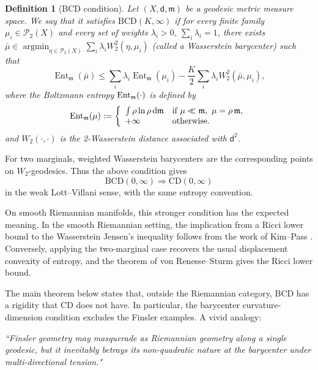 \documentclass[a4paper,11pt]{article}
\numberwithin{equation}{section}
\newtheorem{definition}[theorem]{Definition}
\newcommand{\Ent}{\operatorname{Ent}}
\newcommand{\argmin}{\operatorname*{argmin}}
\newcommand{\dd}{\mathrm d}
\newcommand{\cP}{\mathcal P}
\newcommand{\mm}{\mathfrak m}
\begin{document}
	\begin{definition}[BCD condition]
		\label{def:bcd-infty}
		Let $(X,\mathsf{d},\mathfrak{m})$ be a geodesic metric measure space. We say that it satisfies $\mathrm{BCD}(K,\infty)$ if for every finite family \(\mu_i\in\cP_2(X)\) and every set of weights $\lambda_i>0$, $\sum_i\lambda_i=1$, there exists $\bar\mu \in\argmin_{\eta\in \cP_2(X)} \sum_{i}\lambda_i W_2^2(\eta,\mu_i)$ (called a Wasserstein barycenter) such that
		\begin{equation}\label{jensen}
			\Ent_\mm(\bar\mu)\le \sum_i\lambda_i\Ent_\mm(\mu_i)-\frac{K}{2} \sum_{i}\lambda_i W_2^2(\bar{\mu},\mu_i),
		\end{equation}
			where the Boltzmann entropy ${\rm Ent}_\mm(\cdot)$ is defined by
			\begin{equation*}
				{\rm Ent}_\mm(\mu):=
				\left \{\begin{array}{ll}
					\int \rho\ln \rho\,\dd\mm &\text{if } \mu\ll \mm,\ \mu=\rho\,\mm,\\
					+\infty &\text{otherwise}.
				\end{array}\right.
			\end{equation*}
			and $W_2(\cdot,\cdot)$
		is the 2-Wasserstein distance associated with $\mathsf{d}^2$. 
		
	\end{definition}
	
	
	
	For two marginals, weighted Wasserstein barycenters are the corresponding points on \(W_2\)-geodesics. Thus the above condition gives
	\[
	\mathrm{BCD}(0,\infty)\Longrightarrow \mathrm{CD}(0,\infty)
	\]
	in the weak Lott--Villani sense, with the same entropy convention. 
	
	
	
	On smooth Riemannian manifolds, this stronger condition has the expected meaning. In the smooth Riemannian setting, the implication from a Ricci lower bound to the Wasserstein Jensen's inequality follows from the work of Kim--Pass \cite{KimPass}. Conversely, applying the two-marginal case recovers the usual displacement convexity of entropy, and the theorem of von Renesse--Sturm \cite{vRenesseSturm} gives the Ricci lower bound.
	
	\medskip
	
	The main theorem below states that, outside the Riemannian category, BCD has a rigidity that CD does not have. In particular, the barycenter curvature-dimension condition excludes the Finsler examples.  A vivid analogy:
	\begin{center}
	\emph{``Finsler geometry may masquerade as Riemannian geometry along a single geodesic, but it inevitably betrays its non-quadratic nature at the barycenter under multi-directional tension."}
	\end{center}
	
\end{document}
